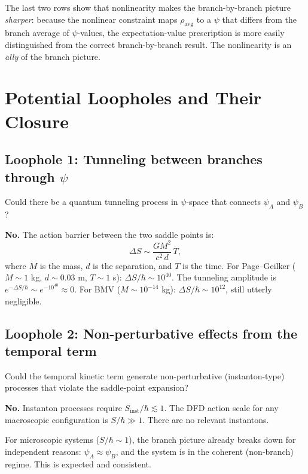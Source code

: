\documentclass[12pt,a4paper]{article}
\begin{document}
The last two rows show that nonlinearity makes the branch-by-branch
picture \emph{sharper}: because the nonlinear constraint maps
$\rho_\mathrm{avg}$ to a $\psi$ that differs from the branch average
of $\psi$-values, the expectation-value prescription is more easily
distinguished from the correct branch-by-branch result. The nonlinearity
is an \emph{ally} of the branch picture.


\section{Potential Loopholes and Their Closure}
\label{sec:loopholes}

\subsection{Loophole 1: Tunneling between branches through $\psi$}

Could there be a quantum tunneling process in $\psi$-space that connects
$\psi_A$ and $\psi_B$?

\textbf{No.} The action barrier between the two saddle points is:
\begin{equation}
\Delta S \sim \frac{G M^2}{c^2\,d}\,T,
\end{equation}
where $M$ is the mass, $d$ is the separation, and $T$ is the time.
For Page--Geilker ($M \sim 1$ kg, $d \sim 0.03$ m, $T \sim 1$ s):
$\Delta S/\hbar \sim 10^{40}$. The tunneling amplitude is
$e^{-\Delta S/\hbar} \sim e^{-10^{40}} \approx 0$. For BMV
($M \sim 10^{-14}$ kg): $\Delta S/\hbar \sim 10^{12}$, still
utterly negligible.

\subsection{Loophole 2: Non-perturbative effects from the temporal term}

Could the temporal kinetic term generate non-perturbative
(instanton-type) processes that violate the saddle-point expansion?

\textbf{No.} Instanton processes require $S_\mathrm{inst}/\hbar \lesssim 1$.
The DFD action scale for any macroscopic configuration is
$S/\hbar \gg 1$. There are no relevant instantons.

For microscopic systems ($S/\hbar \sim 1$), the branch picture already
breaks down for independent reasons: $\psi_A \approx \psi_B$, and the
system is in the coherent (non-branch) regime. This is expected and
consistent.
\end{document}
